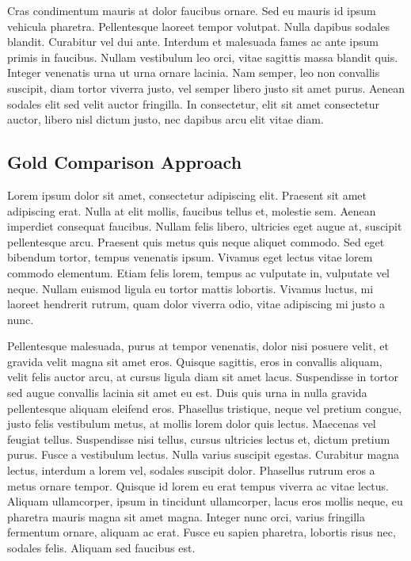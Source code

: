 \documentclass[final,5p,times,twocolumn]{elsarticle}
\begin{document}
Cras condimentum mauris at dolor faucibus ornare. Sed eu mauris id ipsum
vehicula pharetra. Pellentesque laoreet tempor volutpat. Nulla dapibus sodales
blandit. Curabitur vel dui ante. Interdum et malesuada fames ac ante ipsum
primis in faucibus. Nullam vestibulum leo orci, vitae sagittis massa blandit
quis. Integer venenatis urna ut urna ornare lacinia. Nam semper, leo non
convallis suscipit, diam tortor viverra justo, vel semper libero justo sit amet
purus. Aenean sodales elit sed velit auctor fringilla. In consectetur, elit sit
amet consectetur auctor, libero nisl dictum justo, nec dapibus arcu elit vitae
diam.

\subsection{Gold Comparison Approach}
\label{process:gold}

Lorem ipsum dolor sit amet, consectetur adipiscing elit. Praesent sit amet
adipiscing erat. Nulla at elit mollis, faucibus tellus et, molestie sem. Aenean
imperdiet consequat faucibus. Nullam felis libero, ultricies eget augue at,
suscipit pellentesque arcu. Praesent quis metus quis neque aliquet commodo. Sed
eget bibendum tortor, tempus venenatis ipsum. Vivamus eget lectus vitae lorem
commodo elementum. Etiam felis lorem, tempus ac vulputate in, vulputate vel
neque. Nullam euismod ligula eu tortor mattis lobortis. Vivamus luctus, mi
laoreet hendrerit rutrum, quam dolor viverra odio, vitae adipiscing mi justo a
nunc.

Pellentesque malesuada, purus at tempor venenatis, dolor nisi posuere velit, et
gravida velit magna sit amet eros. Quisque sagittis, eros in convallis aliquam,
velit felis auctor arcu, at cursus ligula diam sit amet lacus. Suspendisse in
tortor sed augue convallis lacinia sit amet eu est. Duis quis urna in nulla
gravida pellentesque aliquam eleifend eros. Phasellus tristique, neque vel
pretium congue, justo felis vestibulum metus, at mollis lorem dolor quis
lectus. Maecenas vel feugiat tellus. Suspendisse nisi tellus, cursus ultricies
lectus et, dictum pretium purus. Fusce a vestibulum lectus. Nulla varius
suscipit egestas. Curabitur magna lectus, interdum a lorem vel, sodales
suscipit dolor. Phasellus rutrum eros a metus ornare tempor. Quisque id lorem
eu erat tempus viverra ac vitae lectus. Aliquam ullamcorper, ipsum in tincidunt
ullamcorper, lacus eros mollis neque, eu pharetra mauris magna sit amet magna.
Integer nunc orci, varius fringilla fermentum ornare, aliquam ac erat. Fusce eu
sapien pharetra, lobortis risus nec, sodales felis. Aliquam sed faucibus est.
\end{document}
